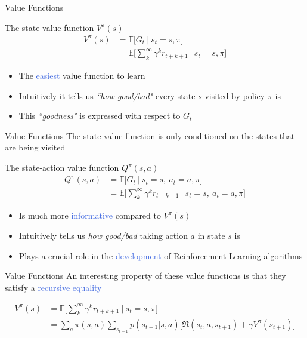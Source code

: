 \documentclass{beamer}
\begin{document}
\begin{frame}{Value Functions}
	\begin{block}{The state-value function $V^{\pi}(s)$}
		\begin{align*}
			V^{\pi}(s) & = \mathds{E} \bigg[G_t \: \big| \: s_t=s,\pi \bigg] \\ 
				& = \mathds{E} \bigg[\sum_{k}^{\infty}\gamma^{k} r_{t+k+1} \: \bigg| \: s_t=s,\pi \bigg]
		\end{align*}
	\end{block}

	\begin{itemize}
		\item The \textcolor{RoyalBlue}{easiest} value function to learn
		\item Intuitively it tells us \textit{``how good/bad"} every state $s$ visited by policy $\pi$ is
		\item This \textit{``goodness"} is expressed with respect to $G_t$
	\end{itemize}

\end{frame}

\begin{frame}{Value Functions}
	The state-value function is only conditioned on the states that are being visited
	
	\begin{block}{The state-action value function $Q^{\pi}(s,a)$}
		\begin{align*}
		Q^{\pi}(s,a) & = \mathds{E} \bigg[G_t \: \big| \: s_t=s, \: a_t=a,  \pi \bigg] \\ 
			& = \mathds{E} \bigg[\sum_{k}^{\infty}\gamma^{k} r_{t+k+1} \: \bigg| \: s_t=s, \: a_t=a, \pi \bigg]
		\end{align*}
	\end{block}

	\begin{itemize}
		\item Is much more \textcolor{RoyalBlue}{informative} compared to $V^{\pi}(s)$
		\item Intuitively tells us \textit{how good/bad} taking action $a$ in state $s$ is
		\item Plays a crucial role in the \textcolor{RoyalBlue}{development} of Reinforcement Learning algorithms
	\end{itemize}

\end{frame}

\begin{frame}{Value Functions}
	An interesting property of these value functions is that they satisfy a \textcolor{RoyalBlue}{recursive equality}

		\begin{align*}
			V^{\pi}(s) & = \mathds{E} \bigg[\sum_{k}^{\infty}\gamma^{k} r_{t+k+1} \: \bigg| \: s_t=s,\pi \bigg] \\
			   & = \sum_a \pi(s,a) \sum_{s_{t+1}} p(s_{t+1}|s,a)\big[\Re(s_t, a, s_{t+1}) + \gamma V^{\pi}(s_{t+1}) \big] 
		\end{align*}
\end{frame}
\end{document}
